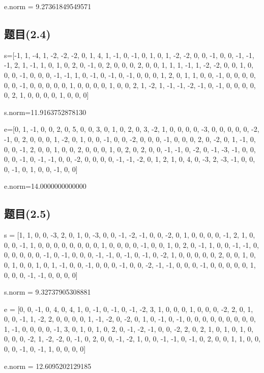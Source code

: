 \documentclass[12pt,a4paper]{article}
\numberwithin{equation}{section}
\begin{document}
e.norm = 9.27361849549571

\subsection{题目(2.4)}

s=[-1, 1, -4, 1, -2, -2, -2, 0, 1, 4, 1, -1, 0, -1, 0, 1, 0, 1, -2, -2, 0, 0, -1, 0, 0, -1, -1, -1, 2, 1, -1, 1, 0, 1, 0, 2, 0, -1, 0, 2, 0, 0, 0, 2, 0, 0, 1, 1, 1, -1, 1, -2, -2, 0, 0, 1, 0, 0, 0, -1, 0, 0, 0, -1, -1, 1, 0, -1, 0, -1, 0, -1, 0, 0, 0, 1, 2, 0, 1, 1, 0, 0, -1, 0, 0, 0, 0, 0, 0, -1, 0, 0, 0, 0, 0, 1, 0, 0, 0, 0, 1, 0, 0, 2, 1, -2, 1, -1, -1, -2, -1, 0, -1, 0, 0, 0, 0, 0, 2, 1, 0, 0, 0, 0, 1, 0, 0, 0]

s.norm=11.9163752878130

e=[0, 1, -1, 0, 0, 2, 0, 5, 0, 0, 3, 0, 1, 0, 2, 0, 3, -2, 1, 0, 0, 0, 0, -3, 0, 0, 0, 0, 0, -2, -1, 0, 2, 0, 0, 0, 1, -2, 0, 1, 0, 0, -1, 0, 0, -2, 0, 0, 0, -1, 0, 0, 0, 2, 0, -2, 0, 1, -1, 0, 0, 0, -1, 2, 0, 0, 1, 0, 0, 2, 0, 0, 0, 1, 0, 2, 0, 2, 0, 0, -1, -1, 0, -2, 0, -1, -3, -1, 0, 0, 0, 0, -1, 0, -1, -1, 0, 0, -2, 0, 0, 0, 0, -1, -1, -2, 0, 1, 2, 1, 0, 4, 0, -3, 2, -3, -1, 0, 0, 0, -1, 0, 1, 0, 0, -1, 0, 0]

e.norm=14.0000000000000

\subsection{题目(2.5)}

s = [1, 1, 0, 0, -3, 2, 0, 1, 0, -3, 0, 0, -1, -2, -1, 0, 0, -2, 0, 1, 0, 0, 0, 0, -1, 2, 1, 0, 0, 0, -1, 1, 0, 0, 0, 0, 0, 0, 0, 0, 1, 0, 0, 0, 0, -1, 0, 0, 1, 0, 2, 0, -1, 1, 0, 0, -1, -1, 0, 0, 0, 0, 0, 0, -1, 0, -1, 0, 0, 0, -1, -1, 0, -1, 0, -1, 0, -2, 1, 0, 0, 0, 0, 0, 2, 0, 0, 1, 0, 0, 1, 0, 0, 1, 0, 1, -1, 0, 0, -1, 0, 0, 0, -1, 0, 0, -2, -1, -1, 0, 0, 0, -1, 0, 0, 0, 0, 0, 1, 0, 0, 0, -1, -1, 0, 0, 0, 0]

s.norm =  9.32737905308881

e = [0, 0, -1, 0, 4, 0, 4, 1, 0, -1, 0, -1, 0, -1, -2, 3, 1, 0, 0, 0, 1, 0, 0, 0, -2, 2, 0, 1, 0, 0, -1, 1, -2, 2, 0, 0, 0, 0, 1, -1, -2, 0, -2, 0, 1, 0, -1, 0, -1, 0, 0, 0, 0, 0, 0, 0, 0, 0, 1, -1, 0, 0, 0, 0, -1, 3, 0, 1, 0, 1, 0, 2, 0, -1, -2, -1, 0, 0, -2, 2, 0, 2, 1, 0, 1, 0, 1, 0, 0, 0, 0, -2, 1, -2, -2, 0, -1, 0, 2, 0, 0, -1, -2, 1, 0, 0, -1, -1, 0, -1, 0, 2, 0, 0, 1, 1, 0, 0, 0, 0, -1, 0, -1, 1, 0, 0, 0, 0]

e.norm = 12.6095202129185
\end{document}

